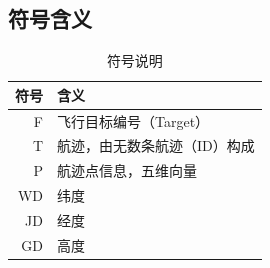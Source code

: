 \documentclass[GBK]{ctexart}
\begin{document}
\begin{spacing}{1.5}
\subsection{符号含义}
\begin{table}[H]
  \centering
  \caption{符号说明}
    \begin{tabular}{|r|l|}
    \toprule[2pt]
    符号    & \multicolumn{1}{l|}{含义} \\
    \midrule[1pt]
    \rowcolor[rgb]{ .816,  .808,  .808} F    & 飞行目标编号（Target）\\

    T    & 航迹，由无数条航迹（ID）构成 \\

    \rowcolor[rgb]{ .816,  .808,  .808} P & 航迹点信息，五维向量 \\

    WD & 纬度 \\

    \rowcolor[rgb]{ .816,  .808,  .808} JD & 经度\\

     GD  & 高度 \\


\end{tabular}
\end{table}
\end{spacing}
\end{document}
